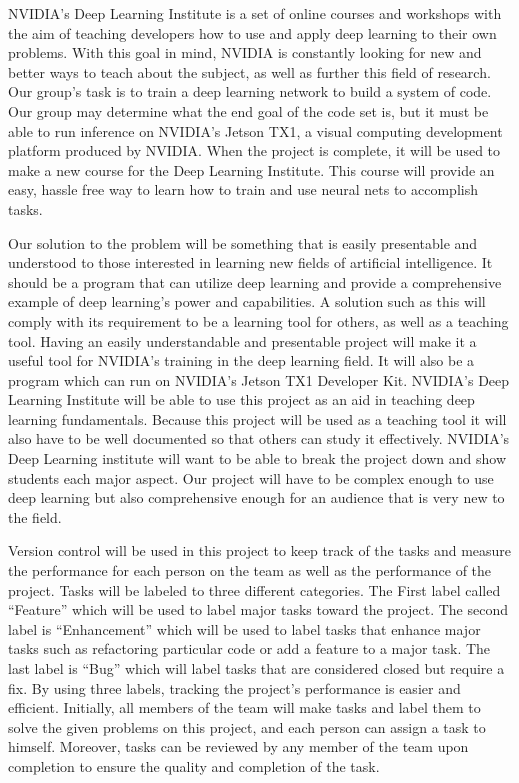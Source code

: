 \documentclass[letterpaper,10pt]{article}
\begin{document}
NVIDIA’s Deep Learning Institute is a set of online courses and workshops with the aim of teaching developers how to use and apply deep learning to their own problems. With this goal in mind, NVIDIA is constantly looking for new and better ways to teach about the subject, as well as further this field of research. Our group’s task is to train a deep learning network to build a system of code. Our group may determine what the end goal of the code set is, but it must be able to run inference on NVIDIA’s Jetson TX1, a visual computing development platform produced by NVIDIA. When the project is complete, it will be used to make a new course for the Deep Learning Institute. This course will provide an easy, hassle free way to learn how to train and use neural nets to accomplish tasks.  

Our solution to the problem will be something that is easily presentable and understood to those interested in learning new fields of artificial intelligence. It should be a program that can utilize deep learning and provide a comprehensive example of deep learning's power and capabilities. A solution such as this will comply with its requirement to be a learning tool for others, as well as a teaching tool. Having an easily understandable and presentable project will make it a useful tool for NVIDIA's training in the deep learning field. It will also be a program which can run on NVIDIA's Jetson TX1 Developer Kit. NVIDIA's Deep Learning Institute will be able to use this project as an aid in teaching deep learning fundamentals. Because this project will be used as a teaching tool it will also have to be well documented so that others can study it effectively. NVIDIA's Deep Learning institute will want to be able to break the project down and show students each major aspect. Our project will have to be complex enough to use deep learning but also comprehensive enough for an audience that is very new to the field.  

Version control will be used in this project to keep track of the tasks and measure the performance for each person on the team as well as the performance of the project. Tasks will be labeled to three different categories. The First label called “Feature” which will be used to label major tasks toward the project. The second label is “Enhancement” which will be used to label tasks that enhance major tasks such as refactoring particular code or add a feature to a major task. The last label is “Bug” which will label tasks that are considered closed but require a fix. By using three labels, tracking the project’s performance is easier and efficient. Initially, all members of the team will make tasks and label them to solve the given problems on this project, and each person can assign a task to himself. Moreover, tasks can be reviewed by any member of the team upon completion to ensure the quality and completion of the task.
\end{document}
